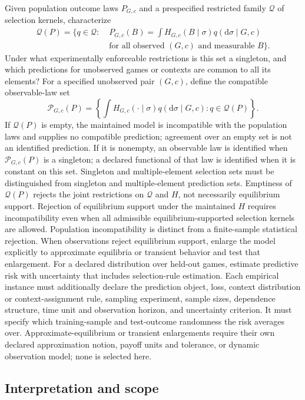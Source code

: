 \documentclass[11pt,a4paper]{article}
\begin{document}
Given population outcome laws $P_{G,c}$ and a prespecified restricted family $\mathcal Q$ of selection kernels, characterize
\[
\begin{aligned}
\mathcal Q(P)=\bigl\{q\in\mathcal Q:\;&
 P_{G,c}(B)=\int H_{G,c}(B\mid\sigma)q(\mathrm d\sigma\mid G,c)\\
 &\text{for all observed }(G,c)\text{ and measurable }B\bigr\}.
\end{aligned}
\]
Under what experimentally enforceable restrictions is this set a singleton, and which predictions for unobserved games or contexts are common to all its elements? For a specified unobserved pair $(G,c)$, define the compatible observable-law set
\[
\mathcal P_{G,c}(P)=\left\{\int H_{G,c}(\cdot\mid\sigma)q(\mathrm d\sigma\mid G,c):q\in\mathcal Q(P)\right\}.
\]
If $\mathcal Q(P)$ is empty, the maintained model is incompatible with the population laws and supplies no compatible prediction; agreement over an empty set is not an identified prediction. If it is nonempty, an observable law is identified when $\mathcal P_{G,c}(P)$ is a singleton; a declared functional of that law is identified when it is constant on this set. Singleton and multiple-element selection sets must be distinguished from singleton and multiple-element prediction sets. Emptiness of $\mathcal Q(P)$ rejects the joint restrictions on $\mathcal Q$ and $H$, not necessarily equilibrium support. Rejection of equilibrium support under the maintained $H$ requires incompatibility even when all admissible equilibrium-supported selection kernels are allowed. Population incompatibility is distinct from a finite-sample statistical rejection. When observations reject equilibrium support, enlarge the model explicitly to approximate equilibria or transient behavior and test that enlargement. For a declared distribution over held-out games, estimate predictive risk with uncertainty that includes selection-rule estimation. Each empirical instance must additionally declare the prediction object, loss, context distribution or context-assignment rule, sampling experiment, sample sizes, dependence structure, time unit and observation horizon, and uncertainty criterion. It must specify which training-sample and test-outcome randomness the risk averages over. Approximate-equilibrium or transient enlargements require their own declared approximation notion, payoff units and tolerance, or dynamic observation model; none is selected here.

\subsection*{Interpretation and scope}
\end{document}
